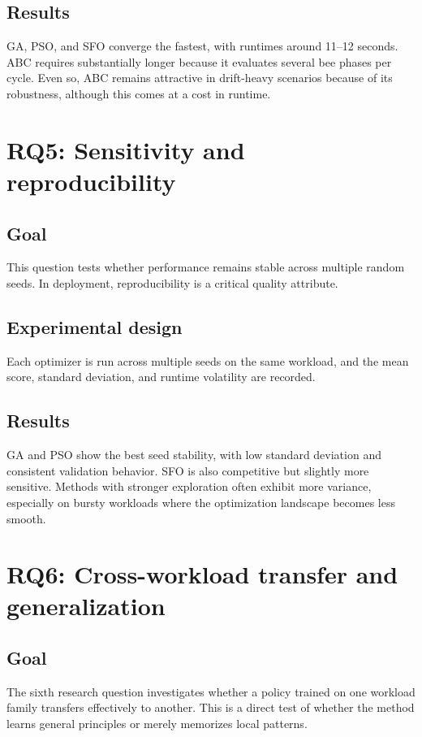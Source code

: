 \documentclass[10pt,journal,compsoc]{IEEEtran}
\begin{document}
\subsection{Results}
GA, PSO, and SFO converge the fastest, with runtimes around 11--12 seconds. ABC requires substantially longer because it evaluates several bee phases per cycle. Even so, ABC remains attractive in drift-heavy scenarios because of its robustness, although this comes at a cost in runtime.

\section{RQ5: Sensitivity and reproducibility}
\subsection{Goal}
This question tests whether performance remains stable across multiple random seeds. In deployment, reproducibility is a critical quality attribute.

\subsection{Experimental design}
Each optimizer is run across multiple seeds on the same workload, and the mean score, standard deviation, and runtime volatility are recorded.

\subsection{Results}
GA and PSO show the best seed stability, with low standard deviation and consistent validation behavior. SFO is also competitive but slightly more sensitive. Methods with stronger exploration often exhibit more variance, especially on bursty workloads where the optimization landscape becomes less smooth.

\section{RQ6: Cross-workload transfer and generalization}
\subsection{Goal}
The sixth research question investigates whether a policy trained on one workload family transfers effectively to another. This is a direct test of whether the method learns general principles or merely memorizes local patterns.
\end{document}

